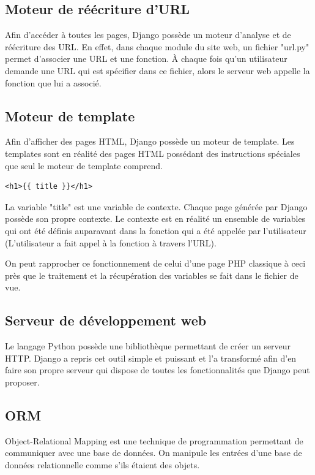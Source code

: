 \documentclass[twoside,UTF8]{EPURapport}
\begin{document}
    \subsection{Moteur de réécriture d'URL}
Afin d'accéder à toutes les pages, Django possède un moteur d'analyse et de réécriture des URL. En effet, dans chaque module du site web, un fichier "url.py" permet d'associer une URL et une fonction. À chaque fois qu'un utilisateur demande une URL qui est spécifier dans ce fichier, alors le serveur web appelle la fonction que lui a associé.

    \subsection{Moteur de template}
Afin d'afficher des pages HTML, Django possède un moteur de template. Les templates sont en réalité des pages HTML possédant des instructions spéciales que seul le moteur de template comprend.

\lstset{language=HTML}
\begin{lstlisting}
<h1>{{ title }}</h1>
\end{lstlisting}

La variable "title" est une variable de contexte. Chaque page générée par Django possède son propre contexte. Le contexte est en réalité un ensemble de variables qui ont été définis auparavant dans la fonction qui a été appelée par l'utilisateur (L'utilisateur a fait appel à la fonction à travers l'URL).

On peut rapprocher ce fonctionnement de celui d'une page PHP classique à ceci près que le traitement et la récupération des variables se fait dans le fichier de vue.

    \subsection{Serveur de développement web}
Le langage Python possède une bibliothèque permettant de créer un serveur HTTP. Django a repris cet outil simple et puissant et l'a transformé afin d'en faire son propre serveur qui dispose de toutes les fonctionnalités que Django peut proposer.

    \subsection{ORM}
Object-Relational Mapping est une technique de programmation permettant de communiquer avec une base de données. On manipule les entrées d'une base de données relationnelle comme s'ils étaient des objets.
\end{document}
